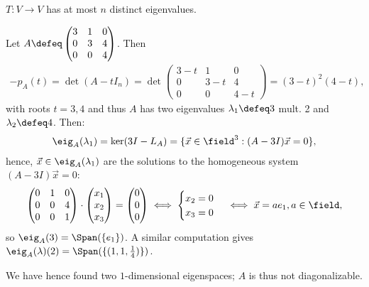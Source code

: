 \begin{corollary}
    $T : V \to V$ has at most $n$ distinct eigenvalues.
\end{corollary}
\begin{example}
    Let $A \defeq \begin{pmatrix}
        3 & 1 & 0\\
        0 & 3& 4\\
        0 & 0 & 4
    \end{pmatrix}$. Then \begin{align*}
        - p_A(t) = \det(A - t I_n) = \det \begin{pmatrix}
            3 - t & 1 & 0 \\
            0 & 3- t & 4\\
            0 & 0 & 4 - t
        \end{pmatrix} = (3 - t)^2(4 - t),
    \end{align*}
    with roots $t = 3, 4$ and thus $A$ has two eigenvalues $\lambda_1 \defeq 3$ mult. 2 and $\lambda_2 \defeq 4$. Then:
    \begin{align*}
        \eig_A(\lambda_1) =  \ker(3 I - L_A) = \{\vec{x} \in \field^3 : (A - 3 I)\vec{x} = 0\},
    \end{align*}
    hence, $\vec{x} \in \eig_A(\lambda_1)$ are the solutions to the homogeneous system $(A - 3I)\vec{x} = 0$:
    \begin{align*}
        \begin{pmatrix}
            0 & 1 & 0 \\
            0 & 0 & 4\\
            0 & 0 & 1
        \end{pmatrix} \cdot \begin{pmatrix}
            x_1\\
            x_2\\
            x_3
        \end{pmatrix} = \begin{pmatrix}
            0\\
            0\\
            0
        \end{pmatrix} \iff \begin{cases}
            x_2 = 0 \\
            x_3 = 0
        \end{cases} \iff \vec{x} = a e_1, a \in \field,
    \end{align*}
    so $\eig_A(3) = \Span(\{e_1\})$.
    A similar computation gives $\eig_A(\lambda)(2) = \Span(\{(1,1, \frac{1}{4})\})$.

    We have hence found two $1$-dimensional eigenspaces; $A$ is thus not diagonalizable.
\end{example}

